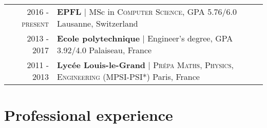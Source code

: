 \documentclass[a4paper,10pt]{article} %
\begin{document}
\begin{tabularx}{\textwidth}{rX}

2016 - \textsc{present} & \textbf{\large EPFL} \hspace{0.2cm} | \hspace{0.01cm} MSc in \textsc{Computer Science}, GPA 5.76/6.0 \hfill Lausanne, Switzerland\vspace{0.2cm} \\

2013 - \textsc{2017} & \textbf{\large Ecole polytechnique} \hspace{0.2cm} | \hspace{0.01cm} Engineer's degree, GPA 3.92/4.0 \hfill Palaiseau, France\vspace{0.2cm} \\

2011 - 2013 & \textbf{\large Lyc\'ee Louis-le-Grand} \hspace{0.2cm} | \hspace{0.01cm} \textsc{Pr\'epa Maths, Physics, Engineering} (MPSI-PSI*) \hfill Paris, France\vspace{0.2cm} \\


\end{tabularx}



\section{Professional experience}
\end{document}
